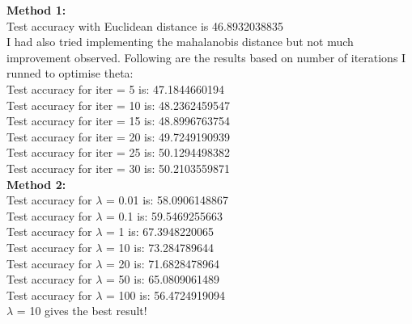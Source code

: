\documentclass[a4paper,11pt]{article}
\begin{document}
\begin{mlsolution}
\noindent\textbf{Method 1:} \\
Test accuracy with Euclidean distance is 46.8932038835 \\
I had also tried implementing the mahalanobis distance but not much improvement observed. Following are the results based on number of iterations I runned to optimise theta: \\
Test accuracy for iter = 5 is: 47.1844660194 \\
Test accuracy for iter = 10 is: 48.2362459547\\
Test accuracy for iter = 15 is: 48.8996763754\\
Test accuracy for iter = 20 is: 49.7249190939\\
Test accuracy for iter = 25 is: 50.1294498382\\
Test accuracy for iter = 30 is: 50.2103559871\\

\noindent\textbf{Method 2:} \\
Test accuracy for $\lambda$ = 0.01 is: 58.0906148867 \\
Test accuracy for $\lambda$ = 0.1 is: 59.5469255663 \\
Test accuracy for $\lambda$ = 1 is: 67.3948220065 \\
Test accuracy for $\lambda$ = 10 is: 73.284789644 \\
Test accuracy for $\lambda$ = 20 is: 71.6828478964 \\
Test accuracy for $\lambda$ = 50 is: 65.0809061489 \\
Test accuracy for $\lambda$ = 100 is: 56.4724919094 \\
$\lambda$ = 10 gives the best result!

\end{mlsolution}
\end{document}
